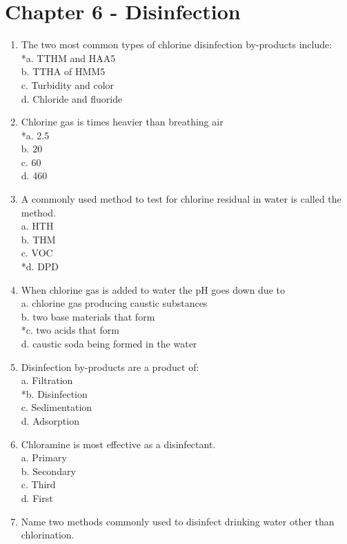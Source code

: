 \section{Chapter 6 - Disinfection}
\begin{enumerate}[1.]
\item The two most common types of chlorine disinfection by-products include:\\
*a. TTHM and HAA5\\
b. TTHA of HMM5\\
c. Turbidity and color\\
d. Chloride and fluoride\\
\item Chlorine gas is times heavier than breathing air\\
*a. 2.5\\
b. 20\\
c. 60\\
d. 460\\
\item A commonly used method to test for chlorine residual in water is called the method.\\
a. HTH\\
b. THM\\
c. VOC\\
*d. DPD\\
\item When chlorine gas is added to water the pH goes down due to\\
a. chlorine gas producing caustic substances\\
b. two base materials that form\\
*c. two acids that form\\
d. caustic soda being formed in the water\\
\item Disinfection by-products are a product of:\\
a. Filtration\\
*b. Disinfection\\
c. Sedimentation\\
d. Adsorption\\
\item Chloramine is most effective as a disinfectant.\\
a. Primary\\
b. Secondary\\
c. Third\\
d. First\\
\item Name two methods commonly used to disinfect drinking water other than chlorination.\\

\end{enumerate}
